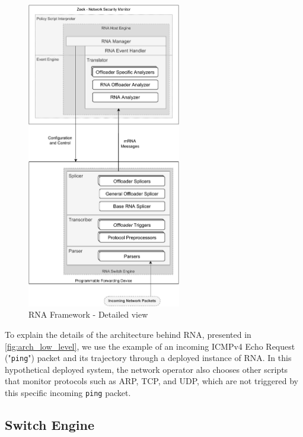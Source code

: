 \begin{figure}[ht!]
    \caption{RNA Framework - Detailed view}
    \begin{center}
        \includegraphics[width=0.6\textwidth]{images/arch_low_level.pdf}  
    \end{center}
    \label{fig:arch_low_level}
\end{figure}

To explain the details of the architecture behind RNA, presented in \autoref{fig:arch_low_level}, we use the example of an incoming ICMPv4 Echo Request ("\texttt{ping}") packet and its trajectory through a deployed instance of RNA. In this hypothetical deployed system, the network operator also chooses other scripts that monitor protocols such as ARP, TCP, and UDP, which are not triggered by this specific incoming \texttt{ping} packet.

\subsection{Switch Engine}

